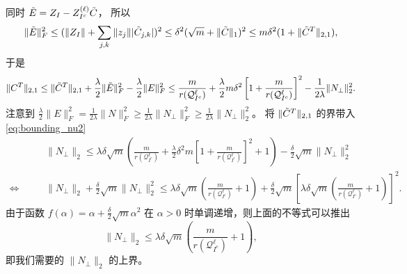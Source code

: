 \documentclass{ctexart}
\begin{document}
同时 $\tilde{E} = Z_I - Z_{I^c}^{(\ell)}\tilde{C}$， 所以 
$$\|\tilde{E}\|_F^2 \leq (\|Z_I\|+\sum_{j,k} \|z_j\||\tilde{C}_{j,k}|)^2
\leq \delta^2 (\sqrt{m} + \|\tilde{C}\|_1)^2\leq m \delta^2(1+ \|\tilde{C}^T\|_{2,1}),$$
于是
$$\|C^T\|_{2,1} \leq \|\tilde{C}^T\|_{2,1} + \frac{\lambda}{2}\|\tilde{E}\|_F^2-\frac{\lambda}{2}\|E\|_F^2
\leq \frac{m}{r{(\mathcal{Q}_{I^c}^{\ell})}}+\frac{\lambda}{2}m\delta^2
\left[1+\frac{m}{r{(\mathcal{Q}_{I^c}^{\ell})}}\right]^2-\frac{1}{2\lambda}\|N_{\perp}\|_2^2.$$
注意到 $\frac{\lambda}{2}\|E\|_F^2=\frac{1}{2\lambda}\|N\|_F^2
\geq\frac{1}{2\lambda}\|N_{\perp}\|_F^2 \geq\frac{1}{2\lambda}\|N_{\perp}\|_2^2$。
将 $\|\tilde{C}^T\|_{2,1}$ 的界带入 \eqref{eq:bounding_nu2} 
\begin{align*}
  &&\;&\|N_{\perp}\|_2 \leq \lambda \delta \sqrt{m} 
  \left(\frac{m}{r(\mathcal{Q}_{I^c}^{\ell})}+\frac{\lambda}{2}\delta^2m
  \left[1+\frac{m}{r(\mathcal{Q}_{I^c}^{\ell})}\right]^2+1\right)
  -\frac{\delta}{2}\sqrt{m}\|N_{\perp}\|_2^2\\
  \Leftrightarrow&&\;
  &\|N_{\perp}\|_2+\frac{\delta}{2}\sqrt{m}\|N_{\perp}\|_2^2\leq
  \lambda\delta\sqrt{m}\left(\frac{m}{r(\mathcal{Q}_{I^c}^{\ell})}+1\right)+
  \frac{\delta}{2}\sqrt{m} \left[\lambda\delta\sqrt{m}
  \left(\frac{m}{r(\mathcal{Q}_{I^c}^{\ell})}+1\right)\right]^2 .
\end{align*}
由于函数 $f(\alpha)=\alpha+\frac{\delta}{2}\sqrt{m}\alpha^2$ 在 $\alpha>0$
时单调递增，则上面的不等式可以推出
\begin{equation}\label{eq:nu2_bound}
  \|N_{\perp}\|_2 \leq \lambda\delta\sqrt{m}\left(\frac{m}{r(\mathcal{Q}_{I^c}^{\ell})}+1\right),
\end{equation}
即我们需要的 $\|N_{\perp}\|_2$ 的上界。
\end{document}
